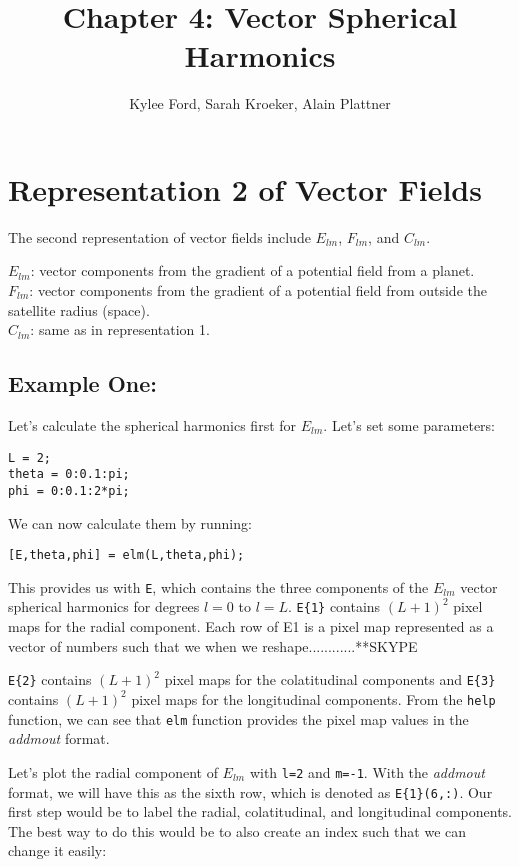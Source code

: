 \documentclass[11pt]{article}
\title{Chapter 4: Vector Spherical Harmonics}
\author{Kylee Ford, Sarah Kroeker, Alain Plattner}
\begin{document}
\maketitle

\section{Representation 2 of Vector Fields}

The second representation of vector fields include $E_{lm}$, $F_{lm}$, and $C_{lm}$.

$E_{lm}$: vector components from the gradient of a potential field from a planet. \\
$F_{lm}$: vector components from the gradient of a potential field from outside the satellite radius (space). \\
$C_{lm}$: same as in representation 1.

\subsection{Example One:} 
Let's calculate the spherical harmonics first for $E_{lm}$.  Let's set some parameters:

\verb|L = 2;|\\
\verb|theta = 0:0.1:pi;|\\
\verb|phi = 0:0.1:2*pi;|

We can now calculate them by running:

\verb|[E,theta,phi] = elm(L,theta,phi);|

This provides us with \verb|E|, which contains the three components of the $E_{lm}$ vector spherical harmonics for degrees $l=0$ to $l=L$.  \verb|E{1}| contains $(L+1)^2$ pixel maps for the radial component.  Each row of E{1} is a pixel map represented as a vector of numbers such that we when we reshape............**SKYPE

\verb|E{2}| contains $(L+1)^2$ pixel maps for the colatitudinal components and \verb|E{3}| contains $(L+1)^2$ pixel maps for the longitudinal components.  From the \verb|help| function, we can see that \verb|elm| function provides the pixel map values in the \textit{addmout} format.  

Let's plot the radial component of $E_{lm}$ with \verb|l=2| and \verb|m=-1|.  With the \textit{addmout} format, we will have this as the sixth row, which is denoted as \verb|E{1}(6,:)|.  Our first step would be to label the radial, colatitudinal, and longitudinal components.  The best way to do this would be to also create an index such that we can change it easily:
\end{document}
